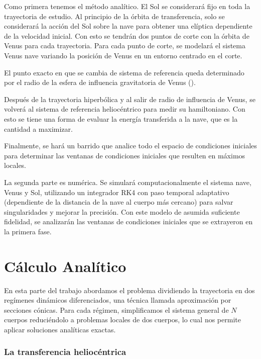 \documentclass{article}
\begin{document}
Como primera tenemos el método analítico. El Sol se considerará
fijo en toda la trayectoria de estudio. Al principio de la órbita de transferencia,
solo se considerará la acción del Sol sobre la nave para obtener una elíptica dependiente
de la velocidad inicial. Con esto se tendrán dos puntos de corte con la órbita
de Venus para cada trayectoria. Para 
cada punto de corte, se modelará el sistema Venus nave variando la posición de Venus
en un entorno centrado en el corte. 

El punto exacto en que se cambia de sistema 
de referencia queda determinado por el radio de
la esfera de influencia gravitatoria de Venus
(\cite{rsoi}). 

Después de la trayectoria hiperbólica y al salir de radio de
influencia de Venus, se volverá al sistema de referencia heliocéntrico para 
medir su hamiltoniano. Con esto se tiene una forma de evaluar la energía transferida
a la nave, que es la cantidad a maximizar.

Finalmente, se hará un barrido que analice todo el espacio de condiciones iniciales
para determinar las ventanas de condiciones iniciales que resulten en máximos locales.

La segunda parte es numérica. Se simulará computacionalmente el sistema nave, Venus y 
Sol, utilizando un integrador RK4 con paso temporal adaptativo (dependiente 
de la distancia de la nave al cuerpo más cercano) para salvar 
singularidades y mejorar la precisión. Con este modelo de asumida suficiente fidelidad,
se analizarán las ventanas de condiciones iniciales que se extrayeron 
en la primera fase.



\newpage
\part{Cálculo Analítico}

En esta parte del trabajo abordamos el problema dividiendo la trayectoria en dos regímenes dinámicos diferenciados, una técnica llamada aproximación por secciones cónicas. Para cada régimen, simplificamos el sistema general de $N$ cuerpos reduciéndolo a problemas locales de dos cuerpos, lo cual nos permite aplicar soluciones analíticas exactas.

\section{La transferencia heliocéntrica}
\end{document}
